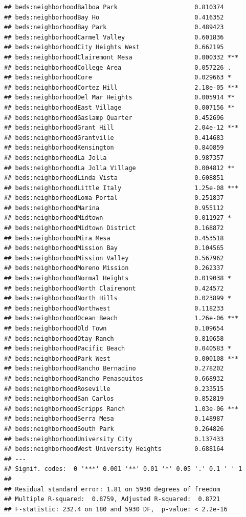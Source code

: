 \documentclass[
]{book}
\begin{document}
\begin{verbatim}
## beds:neighborhoodBalboa Park                     0.810374    
## beds:neighborhoodBay Ho                          0.416352    
## beds:neighborhoodBay Park                        0.489423    
## beds:neighborhoodCarmel Valley                   0.601836    
## beds:neighborhoodCity Heights West               0.662195    
## beds:neighborhoodClairemont Mesa                 0.000332 ***
## beds:neighborhoodCollege Area                    0.057226 .  
## beds:neighborhoodCore                            0.029663 *  
## beds:neighborhoodCortez Hill                     2.18e-05 ***
## beds:neighborhoodDel Mar Heights                 0.005914 ** 
## beds:neighborhoodEast Village                    0.007156 ** 
## beds:neighborhoodGaslamp Quarter                 0.452696    
## beds:neighborhoodGrant Hill                      2.04e-12 ***
## beds:neighborhoodGrantville                      0.414683    
## beds:neighborhoodKensington                      0.840859    
## beds:neighborhoodLa Jolla                        0.987357    
## beds:neighborhoodLa Jolla Village                0.004812 ** 
## beds:neighborhoodLinda Vista                     0.608851    
## beds:neighborhoodLittle Italy                    1.25e-08 ***
## beds:neighborhoodLoma Portal                     0.251837    
## beds:neighborhoodMarina                          0.955112    
## beds:neighborhoodMidtown                         0.011927 *  
## beds:neighborhoodMidtown District                0.168872    
## beds:neighborhoodMira Mesa                       0.453518    
## beds:neighborhoodMission Bay                     0.104565    
## beds:neighborhoodMission Valley                  0.567962    
## beds:neighborhoodMoreno Mission                  0.262337    
## beds:neighborhoodNormal Heights                  0.019038 *  
## beds:neighborhoodNorth Clairemont                0.424572    
## beds:neighborhoodNorth Hills                     0.023899 *  
## beds:neighborhoodNorthwest                       0.118233    
## beds:neighborhoodOcean Beach                     1.26e-06 ***
## beds:neighborhoodOld Town                        0.109654    
## beds:neighborhoodOtay Ranch                      0.810658    
## beds:neighborhoodPacific Beach                   0.040583 *  
## beds:neighborhoodPark West                       0.000108 ***
## beds:neighborhoodRancho Bernadino                0.278202    
## beds:neighborhoodRancho Penasquitos              0.668932    
## beds:neighborhoodRoseville                       0.233515    
## beds:neighborhoodSan Carlos                      0.852819    
## beds:neighborhoodScripps Ranch                   1.03e-06 ***
## beds:neighborhoodSerra Mesa                      0.148987    
## beds:neighborhoodSouth Park                      0.264826    
## beds:neighborhoodUniversity City                 0.137433    
## beds:neighborhoodWest University Heights         0.688164    
## ---
## Signif. codes:  0 '***' 0.001 '**' 0.01 '*' 0.05 '.' 0.1 ' ' 1
## 
## Residual standard error: 1.81 on 5930 degrees of freedom
## Multiple R-squared:  0.8759, Adjusted R-squared:  0.8721 
## F-statistic: 232.4 on 180 and 5930 DF,  p-value: < 2.2e-16
\end{verbatim}
\end{document}
